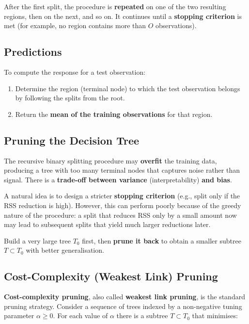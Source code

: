\documentclass[11pt,a4paper]{article}
\theoremstyle{definition}
\theoremstyle{plain}
\theoremstyle{remark}
\begin{document}
After the first split, the procedure is \textbf{repeated} on one of the two resulting regions, then on the next, and so on. It continues until a \textbf{stopping criterion} is met (for example, no region contains more than $O$ observations).

\subsection{Predictions}

To compute the response for a test observation:
\begin{enumerate}
    \item Determine the region (terminal node) to which the test observation belongs by following the splits from the root.
    \item Return the \textbf{mean of the training observations} for that region.
\end{enumerate}

\subsection{Pruning the Decision Tree}

The recursive binary splitting procedure may \textbf{overfit} the training data, producing a tree with too many terminal nodes that captures noise rather than signal. There is a \textbf{trade-off between variance} (interpretability) \textbf{and bias}.

A natural idea is to design a stricter \textbf{stopping criterion} (e.g., split only if the RSS reduction is high). However, this can perform poorly because of the greedy nature of the procedure: a split that reduces RSS only by a small amount now may lead to subsequent splits that yield much larger reductions later.

\begin{tcolorbox}[colback=blue!5!white,colframe=blue!75!black,title=\textbf{Pruning Strategy}]
Build a very large tree $T_0$ first, then \textbf{prune it back} to obtain a smaller subtree $T \subset T_0$ with better generalisation.
\end{tcolorbox}

\subsection{Cost-Complexity (Weakest Link) Pruning}

\textbf{Cost-complexity pruning}, also called \textbf{weakest link pruning}, is the standard pruning strategy. Consider a sequence of trees indexed by a non-negative tuning parameter $\alpha \geq 0$. For each value of $\alpha$ there is a subtree $T \subset T_0$ that minimises:
\end{document}
